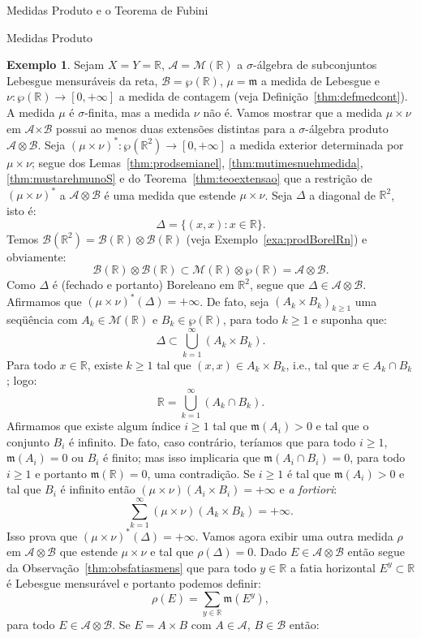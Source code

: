 \documentclass[oneside,final,11pt]{amsbook}
\newcommand{\R}{\mathds R}
\newcommand{\Times}{\pmb{\times}}
\newcommand{\leb}{\mathfrak m}
\newcommand{\Borel}{\mathcal B}
\newcommand{\Lebmens}{\mathcal M}
\theoremstyle{remark}\newtheorem{exercise}{Exercício}[chapter]
\theoremstyle{remark}\newtheorem{*exercise}[exercise]{\hbox to 0pt{\hskip 0pt minus 1fil*}Exercício}
\theoremstyle{definition}\newtheorem{exdefin}{Definição}[chapter]
\theoremstyle{plain}\newtheorem{teo}{Teorema}[section]
\theoremstyle{plain}\newtheorem{lem}[teo]{Lema}
\theoremstyle{plain}\newtheorem{prop}[teo]{Proposição}
\theoremstyle{plain}\newtheorem{cor}[teo]{Corolário}
\theoremstyle{definition}\newtheorem{defin}[teo]{Definição}
\theoremstyle{remark}\newtheorem{rem}[teo]{Observação}
\theoremstyle{definition}\newtheorem{notation}[teo]{Notação}
\theoremstyle{definition}\newtheorem{convention}[teo]{Convenção}
\theoremstyle{definition}\newtheorem{example}[teo]{Exemplo}
\numberwithin{section}{chapter}
\numberwithin{equation}{section}
\begin{document}
\begin{chapter}{Medidas Produto e o Teorema de Fubini}
\begin{section}{Medidas Produto}
\begin{example}\label{exa:mutimesnunaounica}
Sejam $X=Y=\R$, $\mathcal A=\Lebmens(\R)$ a $\sigma$-álgebra de subconjuntos Lebesgue mensuráveis da reta,
$\mathcal B=\wp(\R)$, $\mu=\leb$ a medida de Lebesgue e $\nu:\wp(\R)\to[0,+\infty]$ a medida de contagem
(veja Definição~\ref{thm:defmedcont}). A medida $\mu$ é $\sigma$-finita, mas a medida $\nu$ não é.
Vamos mostrar que a medida $\mu\times\nu$ em $\mathcal A\Times\mathcal B$ possui ao menos duas extensões
distintas para a $\sigma$-álgebra produto $\mathcal A\otimes\mathcal B$. Seja
$(\mu\times\nu)^*:\wp(\R^2)\to[0,+\infty]$ a medida exterior determinada por $\mu\times\nu$;
segue dos Lemas~\ref{thm:prodsemianel}, \ref{thm:mutimesnuehmedida},
\ref{thm:mustarehmunoS} e do Teorema~\ref{thm:teoextensao} que a restrição de $(\mu\times\nu)^*$
a $\mathcal A\otimes\mathcal B$ é uma medida que estende $\mu\times\nu$. Seja $\Delta$ a diagonal de $\R^2$, isto é:
\[\Delta=\big\{(x,x):x\in\R\big\}.\]
Temos $\Borel(\R^2)=\Borel(\R)\otimes\Borel(\R)$ (veja Exemplo~\ref{exa:prodBorelRn}) e
obviamente:
\[\Borel(\R)\otimes\Borel(\R)\subset\Lebmens(\R)\otimes\wp(\R)=\mathcal A\otimes\mathcal B.\]
Como $\Delta$ é (fechado e portanto) Boreleano em $\R^2$, segue que $\Delta\in\mathcal A\otimes\mathcal B$.
Afirmamos que $(\mu\times\nu)^*(\Delta)=+\infty$. De fato, seja $(A_k\times B_k)_{k\ge1}$ uma seqüência
com $A_k\in\Lebmens(\R)$ e $B_k\in\wp(\R)$, para todo $k\ge1$ e suponha que:
\[\Delta\subset\bigcup_{k=1}^\infty(A_k\times B_k).\]
Para todo $x\in\R$, existe $k\ge1$ tal que $(x,x)\in A_k\times B_k$, i.e., tal que $x\in A_k\cap B_k$; logo:
\[\R=\bigcup_{k=1}^\infty(A_k\cap B_k).\]
Afirmamos que existe algum índice $i\ge1$ tal que $\leb(A_i)>0$ e tal que o conjunto $B_i$ é infinito. De fato, caso contrário,
teríamos que para todo $i\ge1$, $\leb(A_i)=0$ ou $B_i$ é finito; mas isso implicaria que $\leb(A_i\cap B_i)=0$,
para todo $i\ge1$ e portanto $\leb(\R)=0$, uma contradição. Se $i\ge1$ é tal que $\leb(A_i)>0$ e tal que
$B_i$ é infinito então $(\mu\times\nu)(A_i\times B_i)=+\infty$ e {\it a fortiori}:
\[\sum_{k=1}^\infty(\mu\times\nu)(A_k\times B_k)=+\infty.\]
Isso prova que $(\mu\times\nu)^*(\Delta)=+\infty$. Vamos agora exibir uma outra medida $\rho$
em $\mathcal A\otimes\mathcal B$ que estende $\mu\times\nu$ e tal que $\rho(\Delta)=0$. Dado
$E\in\mathcal A\otimes\mathcal B$ então segue da Observação~\ref{thm:obsfatiasmens} que para todo $y\in\R$
a fatia horizontal $E^y\subset\R$ é Lebesgue mensurável e portanto podemos definir:
\[\rho(E)=\sum_{y\in\R}\leb(E^y),\]
para todo $E\in\mathcal A\otimes\mathcal B$. Se $E=A\times B$ com $A\in\mathcal A$, $B\in\mathcal B$ então:

\end{example}
\end{section}
\end{chapter}
\end{document}
